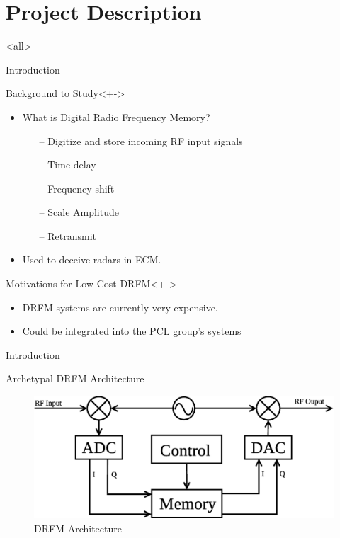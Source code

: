 \section{Project Description}

\mode<all>{ 
}

\begin{frame}{\huge Introduction} 

 \begin{block}{Background to Study}<+->
 		\action<+->  {\begin{itemize}
			\item 	What is Digital Radio Frequency Memory? 
				\begin{itemize}
					\item[--] Digitize and store incoming RF input signals
					\item[--] Time delay 
					\item[--] Frequency shift
					\item[--] Scale Amplitude 
					\item[--] Retransmit
				\end{itemize}
				\item Used to deceive radars in ECM.
		\end{itemize}}
	\end{block} 
	\begin{block}{Motivations for Low Cost DRFM}<+->
		\action<+->  {\begin{itemize}
			\item DRFM systems are currently very expensive.
			\item Could be integrated into the PCL group's systems
		\end{itemize}}
	\end{block}
\end{frame}
\begin{frame}{\huge Introduction} 
\begin{block}{Archetypal DRFM Architecture}
	\action<+->  {\begin{figure}[h!]
			\centering
			\includegraphics[scale = 0.43]{images/DRFM_Intro}
			\caption{DRFM Architecture}
	\end{figure}}
\end{block}
\end{frame}	




